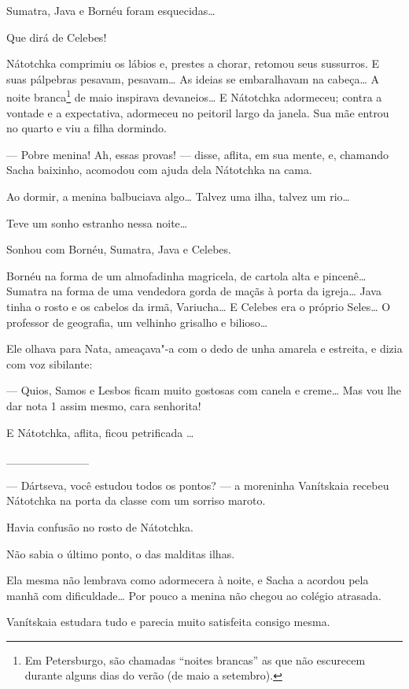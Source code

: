 Sumatra, Java e Bornéu foram esquecidas\ldots{}

Que dirá de Celebes!

Nátotchka comprimiu os lábios e, prestes a chorar, retomou seus
sussurros. E suas pálpebras pesavam, pesavam\ldots{} As ideias se
embaralhavam na cabeça\ldots{} A noite branca\footnote{Em Petersburgo, são
  chamadas ``noites brancas'' as que não escurecem durante alguns dias
  do verão (de maio a setembro).} de maio inspirava devaneios\ldots{} E
Nátotchka adormeceu; contra a vontade e a expectativa, adormeceu no
peitoril largo da janela. Sua mãe entrou no quarto e viu a filha
dormindo.

--- Pobre menina! Ah, essas provas! --- disse, aflita, em sua mente, e,
chamando Sacha baixinho, acomodou com ajuda dela Nátotchka na cama.

Ao dormir, a menina balbuciava algo\ldots{} Talvez uma ilha, talvez um rio\ldots{}

Teve um sonho estranho nessa noite\ldots{}

Sonhou com Bornéu, Sumatra, Java e Celebes.

Bornéu na forma de um almofadinha magricela, de cartola alta e
pincenê\ldots{} Sumatra na forma de uma vendedora gorda de maçãs à porta da
igreja\ldots{} Java tinha o rosto e os cabelos da irmã, Variucha\ldots{} E Celebes
era o próprio Seles\ldots{} O professor de geografia, um velhinho grisalho e
bilioso\ldots{}

Ele olhava para Nata, ameaçava"-a com o dedo de unha amarela e estreita,
e dizia com voz sibilante:

--- Quios, Samos e Lesbos ficam muito gostosas com canela e creme\ldots{} Mas
vou lhe dar nota 1 assim mesmo, cara senhorita!

E Nátotchka, aflita, ficou petrificada \ldots{}

\_\_\_\_\_\_\_\_\_\_

--- Dártseva, você estudou todos os pontos? --- a moreninha Vanítskaia
recebeu Nátotchka na porta da classe com um sorriso maroto.

Havia confusão no rosto de Nátotchka.

Não sabia o último ponto, o das malditas ilhas.

Ela mesma não lembrava como adormecera à noite, e Sacha a acordou pela
manhã com dificuldade\ldots{} Por pouco a menina não chegou ao colégio
atrasada.

Vanítskaia estudara tudo e parecia muito satisfeita consigo mesma.

